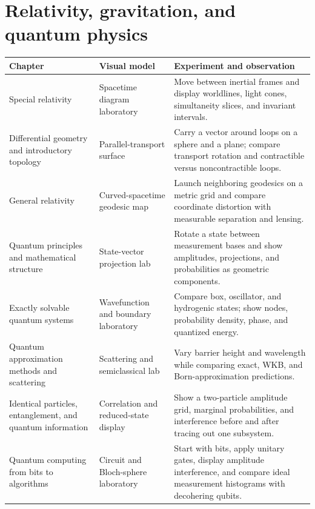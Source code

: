 \documentclass[11pt,oneside]{book}
\theoremstyle{reviewstyle}
\begin{document}
\section{Relativity, gravitation, and quantum physics}
\begin{longtable}{p{}p{}p{}}
\toprule Chapter & Visual model & Experiment and observation\\ \midrule
\endhead
Special relativity & Spacetime diagram laboratory & Move between inertial frames and display worldlines, light cones, simultaneity slices, and invariant intervals.\\
Differential geometry and introductory topology & Parallel-transport surface & Carry a vector around loops on a sphere and a plane; compare transport rotation and contractible versus noncontractible loops.\\
General relativity & Curved-spacetime geodesic map & Launch neighboring geodesics on a metric grid and compare coordinate distortion with measurable separation and lensing.\\
Quantum principles and mathematical structure & State-vector projection lab & Rotate a state between measurement bases and show amplitudes, projections, and probabilities as geometric components.\\
Exactly solvable quantum systems & Wavefunction and boundary laboratory & Compare box, oscillator, and hydrogenic states; show nodes, probability density, phase, and quantized energy.\\
Quantum approximation methods and scattering & Scattering and semiclassical lab & Vary barrier height and wavelength while comparing exact, WKB, and Born-approximation predictions.\\
Identical particles, entanglement, and quantum information & Correlation and reduced-state display & Show a two-particle amplitude grid, marginal probabilities, and interference before and after tracing out one subsystem.\\
Quantum computing from bits to algorithms & Circuit and Bloch-sphere laboratory & Start with bits, apply unitary gates, display amplitude interference, and compare ideal measurement histograms with decohering qubits.\\
\bottomrule
\end{longtable}
\end{document}
